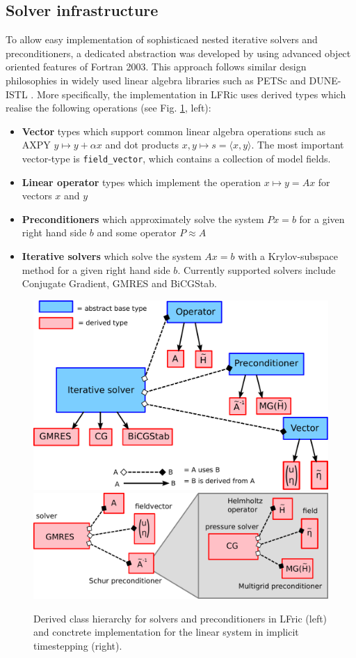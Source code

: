 \documentclass[times]{elsarticle}
\begin{document}
\subsection{Solver infrastructure}
To allow easy implementation of sophisticaed nested iterative solvers and preconditioners, a dedicated abstraction was developed by using advanced object oriented features of Fortran 2003. This approach follows similar design philosophies in widely used linear algebra libraries such as PETSc \cite{Balay1997,Balay2018} and DUNE-ISTL \cite{Blatt2007}. More specifically, the implementation in LFRic uses derived types which realise the following operations (see Fig. \ref{fig:class_hierarchy}, left):
\begin{itemize}
\item \textbf{Vector} types which support common linear algebra operations such as AXPY $y\mapsto y+\alpha x$ and dot products $x,y\mapsto s = \langle x,y\rangle$. The most important vector-type is \texttt{field\_vector}, which contains a collection of model fields.
\item \textbf{Linear operator} types which implement the operation $x\mapsto y=Ax$ for vectors $x$ and $y$
\item \textbf{Preconditioners} which approximately solve the system $Px=b$ for a
  given right hand side $b$ and some operator $P\approx A$
\item \textbf{Iterative solvers} which solve the system $Ax=b$ with a Krylov-subspace method for a given right hand side $b$. Currently supported solvers include Conjugate Gradient, GMRES and BiCGStab.
\end{itemize}
\begin{figure}
  \begin{center}
    \includegraphics[width=0.45\linewidth]{class_hierarchy.pdf}
    \hfill
    \includegraphics[width=0.45\linewidth]{class_concrete.pdf}
    \caption{Derived class hierarchy for solvers and preconditioners in LFric (left) and conctrete implementation for the linear system in implicit timestepping (right).}
    \label{fig:class_hierarchy}
  \end{center}
\end{figure}
\end{document}
